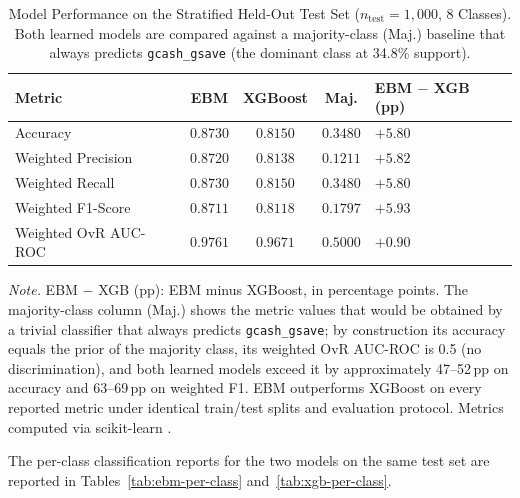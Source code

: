 \documentclass[journal]{./IEEE/IEEEtran}
\begin{document}
\begin{table}[h]
    \centering
    \caption{Model Performance on the Stratified Held-Out Test Set ($n_{\mathrm{test}} = 1{,}000$, 8 Classes). Both learned models are compared against a majority-class (Maj.) baseline that always predicts \texttt{gcash\_gsave} (the dominant class at 34.8\% support).}
    \label{tab:perf}
    \footnotesize
    \begin{tabular}{|p{2.5cm}|c|c|c|p{1.3cm}|}
        \hline
        \textbf{Metric} & \textbf{EBM} & \textbf{XGBoost} & \textbf{Maj.} & \textbf{EBM $-$ XGB (pp)} \\
        \hline
        Accuracy & $0.8730$ & $0.8150$ & $0.3480$ & $+5.80$ \\
        Weighted Precision & $0.8720$ & $0.8138$ & $0.1211$ & $+5.82$ \\
        Weighted Recall & $0.8730$ & $0.8150$ & $0.3480$ & $+5.80$ \\
        Weighted F1-Score & $0.8711$ & $0.8118$ & $0.1797$ & $+5.93$ \\
        Weighted OvR AUC-ROC & $0.9761$ & $0.9671$ & $0.5000$ & $+0.90$ \\
        \hline
    \end{tabular}

    \vspace{0.5em}
    \raggedright\scriptsize \emph{Note.} EBM $-$ XGB (pp): EBM minus XGBoost, in percentage points. The majority-class column (Maj.) shows the metric values that would be obtained by a trivial classifier that always predicts \texttt{gcash\_gsave}; by construction its accuracy equals the prior of the majority class, its weighted OvR AUC-ROC is 0.5 (no discrimination), and both learned models exceed it by approximately 47--52\,pp on accuracy and 63--69\,pp on weighted F1. EBM outperforms XGBoost on every reported metric under identical train/test splits and evaluation protocol. Metrics computed via scikit-learn \cite{ref74}.
\end{table}

The per-class classification reports for the two models on the same test set are reported in Tables~\ref{tab:ebm-per-class} and~\ref{tab:xgb-per-class}.
\end{document}
